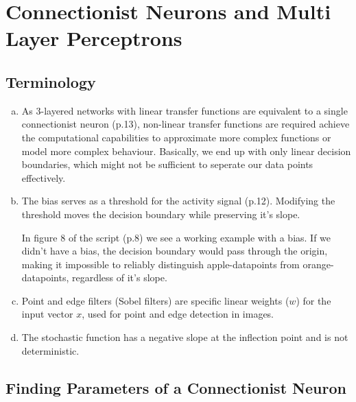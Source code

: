 \documentclass[11pt,a4paper]{article}
\begin{document}
\pagestyle{fancy}

\section*{Connectionist Neurons and Multi Layer Perceptrons}

\subsection*{Terminology}

\begin{enumerate}[a)]
\item

As 3-layered networks with linear transfer functions are equivalent to a single connectionist neuron (p.13), non-linear transfer functions are required achieve the computational capabilities to approximate more complex functions or model more complex behaviour. Basically, we end up with only linear decision boundaries, which might not be sufficient to seperate our data points effectively.

\item

The bias serves as a threshold for the activity signal (p.12). Modifying the threshold moves the decision boundary while preserving it's slope.

In figure 8 of the script (p.8) we see a working example with a bias. If we didn't have a bias, the decision boundary would pass through the origin, making it impossible to reliably distinguish apple-datapoints from orange-datapoints, regardless of it's slope.

\item

Point and edge filters (Sobel filters) are specific linear weights ($w$) for the input vector $x$, used for point and edge detection in images.

\item

The stochastic function has a negative slope at the inflection point and is not deterministic.

\end{enumerate}
\subsection*{Finding Parameters of a Connectionist Neuron}
\end{document}

